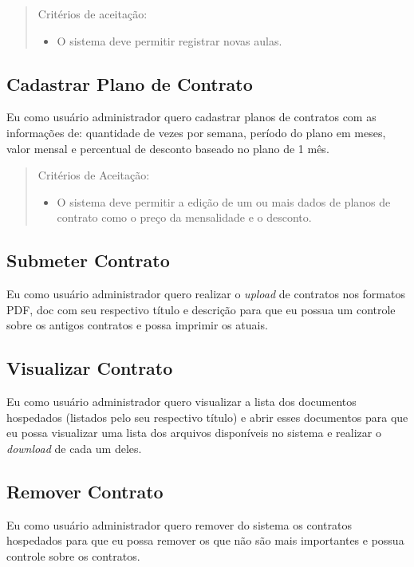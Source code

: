 \begin{quote}
Critérios de aceitação:
    \begin{itemize}
        \item O sistema deve permitir registrar novas aulas.
    \end{itemize}
\end{quote}

\subsection[Cadastrar Plano de Contrato]{Cadastrar Plano de Contrato}
Eu como usuário administrador quero cadastrar planos de contratos com as
informações de: quantidade de vezes por semana, período do plano em meses,
valor mensal e percentual de desconto baseado no plano de 1 mês.

\begin{quote}
Critérios de Aceitação:
    \begin{itemize}
        \item O sistema deve permitir a edição de um ou mais dados de planos de contrato
        como o preço da mensalidade e o desconto.
    \end{itemize}
\end{quote}

\subsection[Submeter Contrato]{Submeter Contrato}
Eu como usuário administrador quero realizar o \textsl{upload} de contratos nos formatos
PDF, doc com seu respectivo título e descrição para que eu possua um controle
sobre os antigos contratos e possa imprimir os atuais.

\subsection[Visualizar Contrato]{Visualizar Contrato}
Eu como usuário administrador quero visualizar a lista dos documentos hospedados
(listados pelo seu respectivo título) e abrir esses documentos para que eu possa
visualizar uma lista dos arquivos disponíveis no sistema e realizar o \textsl{download}
de cada um deles.

\subsection[Remover Contrato]{Remover Contrato}
Eu como usuário administrador quero remover do sistema os contratos hospedados
para que eu possa remover os que não são mais importantes e possua controle
sobre os contratos.

